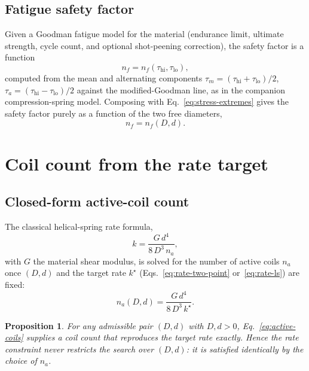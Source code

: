 \documentclass[11pt]{article}
\newtheorem{proposition}{Proposition}
\begin{document}
\subsection{Fatigue safety factor}

Given a Goodman fatigue model for the material (endurance limit,
ultimate strength, cycle count, and optional shot-peening correction),
the safety factor is a function
\begin{equation}
n_f = n_f(\tau_{\mathrm{hi}}, \tau_{\mathrm{lo}}) ,
\label{eq:safety-factor-def}
\end{equation}
computed from the mean and alternating components
$\tau_m = (\tau_{\mathrm{hi}}+\tau_{\mathrm{lo}})/2$,
$\tau_a = (\tau_{\mathrm{hi}}-\tau_{\mathrm{lo}})/2$
against the modified-Goodman line, as in the companion compression-spring
model. Composing with Eq.~\eqref{eq:stress-extremes} gives the safety
factor purely as a function of the two free diameters,
\begin{equation}
n_f = n_f(D,d) .
\label{eq:safety-factor-Dd}
\end{equation}

\section{Coil count from the rate target}

\subsection{Closed-form active-coil count}

The classical helical-spring rate formula,
\begin{equation}
k = \frac{G\,d^{4}}{8\,D^{3}\,n_a},
\label{eq:rate-formula}
\end{equation}
with $G$ the material shear modulus, is solved for the number of active
coils $n_a$ once $(D,d)$ and the target rate $k^{\star}$
(Eqs.~\eqref{eq:rate-two-point} or~\eqref{eq:rate-ls}) are fixed:
\begin{equation}
n_a(D,d) = \frac{G\,d^{4}}{8\,D^{3}\,k^{\star}}.
\label{eq:active-coils}
\end{equation}

\begin{proposition}
For any admissible pair $(D,d)$ with $D,d>0$, Eq.~\eqref{eq:active-coils}
supplies a coil count that reproduces the target rate exactly. Hence the
rate constraint never restricts the search over $(D,d)$: it is satisfied
identically by the choice of $n_a$.
\end{proposition}
\end{document}

